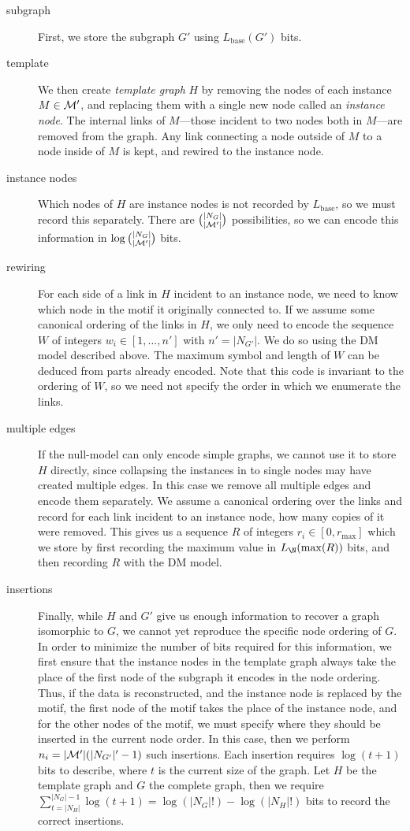 \begin{description}
\item[subgraph] First, we store the subgraph $G'$ using $L_\text{base}(G')$ bits.
\item[template] We then create \emph{template graph} $H$ by removing the nodes of each instance $M \in \cal M'$, and replacing them with a single new node called an \emph{instance node}. The internal links of $M$---those incident to two nodes both in $M$---are removed from the graph. Any link connecting a node outside of $M$ to a node inside of $M$ is kept, and rewired to the instance node.
\item[instance nodes] Which nodes of $H$ are instance nodes is not recorded by $L_\text{base}$, so we must record this separately. There are $|N_{G}| \choose |{\cal M}'|$ possibilities, so we can encode this information in $\log {|N_{G}| \choose |{\cal M}'|}$ bits.
\item[rewiring] For each side of a link in $H$ incident to an instance node, we need to know which node in the motif it originally connected to. If we assume some canonical ordering of the links in $H$, we only need to encode the sequence $W$ of integers $w_i \in [1,\ldots, n']$ with $n'=|N_{G'}|$. We do so using the DM model described above. The maximum symbol and length of $W$ can be deduced from parts already encoded. Note that this code is invariant to the ordering of $W$, so we need not specify the order in which we enumerate the links.
\item[multiple edges] If the null-model can only encode simple graphs, we cannot use it to store $H$ directly, since collapsing the instances in to single nodes may have created multiple edges. In this case we remove all multiple edges and encode them separately. We assume a canonical ordering over the links and record for each link incident to an instance node, how many copies of it were removed. This gives us a sequence $R$ of integers $r_i \in [0, r_\text{max}]$ which we store by first recording the maximum value in $L_\N(\max(R))$ bits, and then recording $R$ with the DM model.
\item[insertions] Finally, while $H$ and $G'$ give us enough information to recover a graph isomorphic to $G$, we cannot yet reproduce the specific node ordering of $G$. In order to minimize the number of bits required for this information, we first ensure that the instance nodes in the template graph always take the place of the first node of the subgraph it encodes in the node ordering. Thus, if the data is reconstructed, and the instance node is replaced by the motif, the first node of the motif takes the place of the instance node, and for the other nodes of the motif, we must specify where they should be inserted in the current node order. In this case, then we perform $n_i = |{\cal M}'| (|N_{G'}|'-1)$ such insertions. Each insertion requires $\log (t+1)$ bits to describe, where $t$ is the current size of the graph. Let $H$ be the template graph and $G$ the complete graph, then we require $\sum_{t=|N_H|}^{|N_G|-1} \log (t+1) = \log (|N_G|!) - \log (|N_H|!)$ bits to record the correct insertions.
\end{description} 

